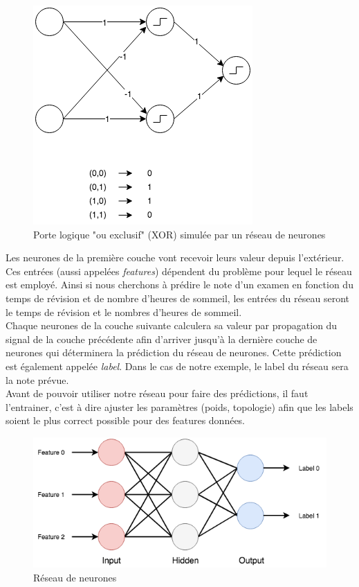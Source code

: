 \documentclass{article}
\begin{document}
\begin{figure}[h]
\begin{center}
	\includegraphics[scale=0.7]{xor.png} 
	\caption{Porte logique "ou exclusif" (XOR) simulée par un réseau de neurones}
\end{center}
\end{figure}

Les neurones de la première couche vont recevoir leurs valeur depuis l'extérieur. Ces entrées (aussi appelées \textit{features}) dépendent du problème pour lequel le réseau est employé. Ainsi si nous cherchons à prédire le note d'un examen en fonction du temps de révision et de nombre d'heures de sommeil, les entrées du réseau seront le temps de révision et le nombres d'heures de sommeil.\\
 Chaque neurones de la couche suivante calculera sa valeur par propagation du signal de la couche précédente afin d'arriver jusqu'à la dernière couche de neurones qui déterminera la prédiction du réseau de neurones. Cette prédiction est également appelée \textit{label}. Dans le cas de notre exemple, le label du réseau sera la note prévue.\\
 Avant de pouvoir utiliser notre réseau pour faire des prédictions, il faut l'entrainer, c'est à dire ajuster les paramètres (poids, topologie) afin que les labels soient le plus correct possible pour des features données.\\
 
\begin{figure}[h]
\begin{center}
	\includegraphics[scale=0.7]{ff.png}
	\caption{Réseau de neurones}
\end{center}
\end{figure}
 
\end{document}
